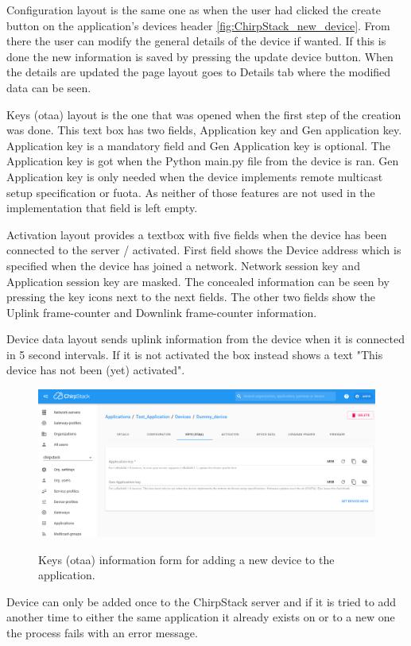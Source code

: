 Configuration layout is the same one as when the user had clicked the create button on the application's devices header \ref{fig:ChirpStack_new_device}.
From there the user can modify the general details of the device if wanted.
If this is done the new information is saved by pressing the update device button.
When the details are updated the page layout goes to Details tab where the modified data can be seen.

Keys (\gls{otaa}) layout is the one that was opened when the first step of the creation was done.
This text box has two fields, Application key and Gen application key.
Application key is a mandatory field and Gen Application key is optional.
The Application key is got when the Python main.py file from the device is ran.
Gen Application key is only needed when the device implements remote multicast setup specification or \gls{fuota}.
As neither of those features are not used in the implementation that field is left empty.

Activation layout provides a textbox with five fields when the device has been connected to the server / activated.
First field shows the Device address which is specified when the device has joined a network.
Network session key and Application session key are masked.
The concealed information can be seen by pressing the key icons next to the next fields.
The other two fields show the Uplink frame-counter and Downlink frame-counter information.

Device data layout sends uplink information from the device when it is connected in 5 second intervals.
If it is not activated the box instead shows a text "This device has not been (yet) activated".


\begin{figure}[ht]
  \centering
  {\includegraphics[width=\textwidth]{illustration/ChirpStack_new_device_2.png}}
  \caption{Keys (\gls{otaa}) information form for adding a new device to the application.}
  \label{fig:ChirpStack_new_device_2}
\end{figure}

Device can only be added once to the ChirpStack server and if it is tried to add another time to either the same application it already exists on or to a new one the process fails with an error message.


\clearpage %
